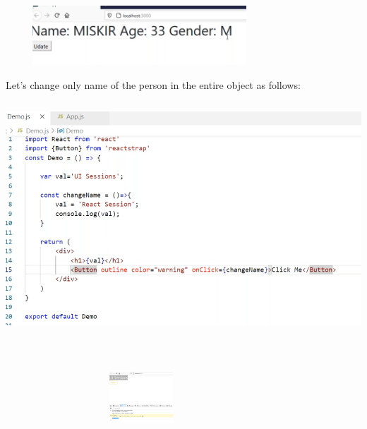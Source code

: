 \documentclass{article}
\begin{document}
\noindent \\


\begin{center}
	\noindent \includegraphics*[width=3.95in, height=0.88in]{IMG-10-09}
\end{center}

\noindent 

\noindent 

\noindent 

\noindent 

\noindent 
\newpage
\noindent Let's change only name of the person in the entire object as follows:

\noindent 

\begin{center}
	\noindent \includegraphics*[width=6.22in, height=3.44in]{IMG-10-10}
\end{center}

\noindent \\



\begin{flushleft}
	\noindent \includegraphics*[width=4.00in, height=0.76in]{IMG-10-11}
\end{flushleft}
\end{document}
